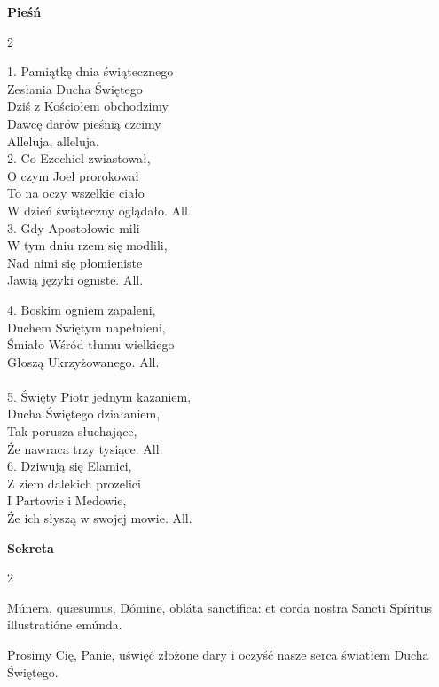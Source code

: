 \documentclass[10pt,a5paper]{book}
\newcommand{\oremus}[3]{\medskip\centerline{\textbf{#1}}\medskip
	\begin{sloppypar}
		\begin{paracol}{2}
			\setlength{\columnsep}{0em}
			\begin{leftcolumn}
				#2
			\end{leftcolumn}
			\begin{rightcolumn}
				#3
			\end{rightcolumn}
		\end{paracol}
	\end{sloppypar}}
\begin{document}
					\oremus{Pieśń}{
						1. Pamiątkę dnia świątecznego\\
						Zesłania Ducha Świętego\\
						Dziś z Kościołem obchodzimy\\
						Dawcę darów pieśnią czcimy\\
						Alleluja, alleluja.\\
						
						2. Co Ezechiel zwiastował,\\
						O czym Joel prorokował\\
						To na oczy wszelkie ciało\\
						W dzień świąteczny oglądało. All.\\ 
						
						3. Gdy Apostołowie mili \\
						W tym dniu rzem się modlili,\\
						Nad nimi się płomieniste\\
						Jawią języki ogniste. All.}{
						4. Boskim ogniem zapaleni,\\
						Duchem Swiętym napełnieni,\\
						Śmiało Wśród tłumu wielkiego\\
						Głoszą Ukrzyżowanego. All.\\ \\
						
						5. Święty Piotr jednym kazaniem,\\
						Ducha Świętego działaniem,\\
						Tak porusza słuchające,\\
						Że nawraca trzy tysiące. All.\\
						
						6. Dziwują się Elamici,\\
						Z ziem dalekich prozelici\\
						I Partowie i Medowie,\\
						Że ich słyszą w swojej mowie. All.}
					
					\oremus{Sekreta}{
						Múnera, qu\ae sumus, Dómine, obláta sanctífica: et corda nostra Sancti Spíritus illustratióne emúnda.}{
						Prosimy Cię, Panie, uświęć złożone dary i oczyść nasze serca światłem Ducha Świętego.}
					
\end{document}
